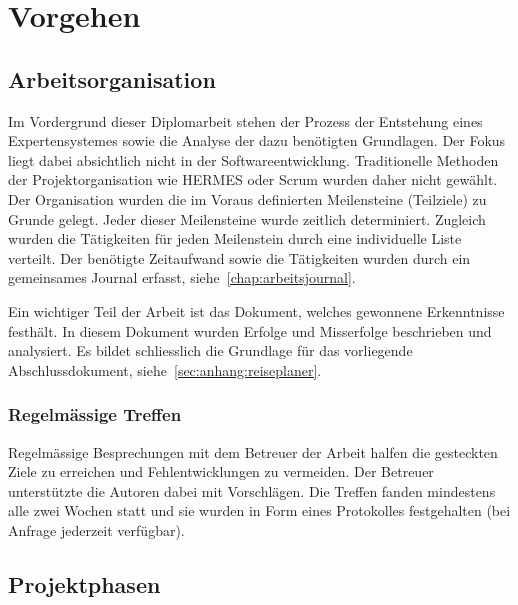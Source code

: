 \chapter{Vorgehen}
\label{chap:vorgehen}

\section{Arbeitsorganisation}
\label{sec:vorgehen_orga}
Im Vordergrund dieser Diplomarbeit stehen der Prozess der Entstehung eines Expertensystemes sowie die Analyse der dazu benötigten Grundlagen. Der Fokus liegt dabei absichtlich nicht in der Softwareentwicklung. Traditionelle Methoden der Projektorganisation wie HERMES oder Scrum wurden daher nicht gewählt.\\
Der Organisation wurden die im Voraus definierten Meilensteine (Teilziele) zu Grunde gelegt. Jeder dieser Meilensteine wurde zeitlich determiniert. Zugleich wurden die Tätigkeiten für jeden Meilenstein durch eine individuelle Liste verteilt. Der benötigte Zeitaufwand sowie die Tätigkeiten wurden durch ein gemeinsames Journal erfasst, siehe~\ref{chap:arbeitsjournal}.

Ein wichtiger Teil der Arbeit ist das Dokument, welches gewonnene Erkenntnisse festhält. In diesem Dokument wurden Erfolge und Misserfolge beschrieben und analysiert. Es bildet schliesslich die Grundlage für das vorliegende Abschlussdokument, siehe~\ref{sec:anhang:reiseplaner}.

\subsection{Regelmässige Treffen}
\label{sec:vorgehen_orga_treffen}
Regelmässige Besprechungen mit dem Betreuer der Arbeit halfen die gesteckten Ziele zu erreichen und Fehlentwicklungen zu vermeiden. Der Betreuer unterstützte die Autoren dabei mit Vorschlägen. Die Treffen fanden mindestens alle zwei Wochen statt und sie wurden in Form eines Protokolles festgehalten (bei Anfrage jederzeit verfügbar).

\section{Projektphasen}
\label{sec:projektphasen}

